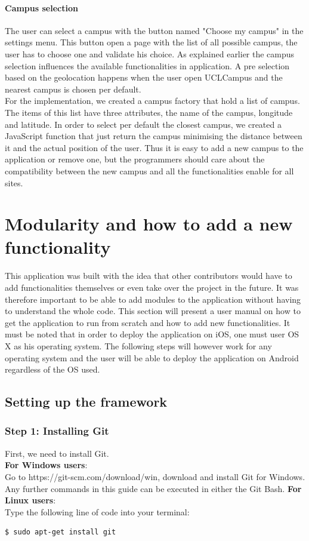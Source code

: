 \documentclass[11pt, a4paper]{report}
\begin{document}
\paragraph{Campus selection} The user can select a campus with the button named "Choose my campus" in the settings menu. This button open a page with the list of all possible campus, the user has to choose one and validate his choice. As explained earlier the campus selection influences the available functionalities in application. A pre selection based on the geolocation happens when the user open UCLCampus and the nearest campus is chosen per default.\\
For the implementation, we created a campus factory that hold a list of campus. The items of this list have three attributes, the name of the campus, longitude and latitude. In order to select per default the closest campus, we created a JavaScript function that just return the campus minimising the distance between it and the actual position of the user. Thus it is easy to add a new campus to the application or remove one, but the programmers should care about the compatibility between the new campus and all the functionalities enable for all sites. 



\section{Modularity and how to add a new functionality}
This application was built with the idea that other contributors would have to add functionalities themselves or even take over the project in the future. It was therefore important to be able to add modules to the application without having to understand the whole code. 
This section will present a user manual on how to get the application to run from scratch and how to add new functionalities.  It must be noted that in order to deploy the application on iOS, one must user OS X as his operating system.  The following steps will however work for any operating system and the user will be able to deploy the application on Android regardless of the OS used.
\subsection{Setting up the framework}
\subsubsection{Step 1: Installing Git}
First,  we need to install Git.\\
\textbf{For Windows users}: \\
Go to https://git-scm.com/download/win, download and install Git for Windows. Any further commands in this guide can be executed in either the Git Bash. 
\textbf{For Linux users}: \\
Type the following line of code into your terminal:
\begin{lstlisting}[language=bash]
  $ sudo apt-get install git
\end{lstlisting}
\end{document}
